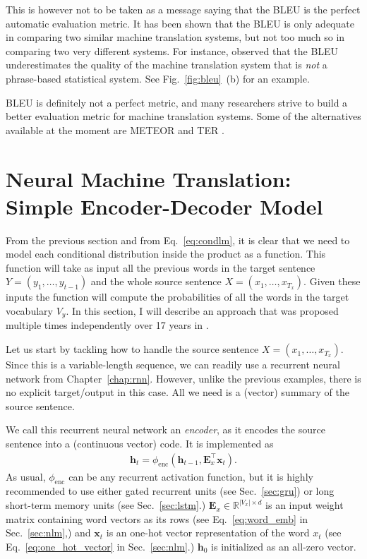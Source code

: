 \documentclass{report}
\newcommand{\vect}[1]{\mathbf{#1}}
\newcommand{\matr}[1]{\mathbf{#1}}
\newcommand{\vh}[0]{\vect{h}}
\newcommand{\vx}[0]{\vect{x}}
\newcommand{\mE}[0]{\matr{E}}
\newcommand{\RR}[0]{\mathbb{R}}
\newcommand{\enc}{\text{enc}}
\begin{document}
This is however not to be taken as a message saying that the BLEU is the perfect
automatic evaluation metric. It has been shown that the BLEU is only adequate in
comparing two similar machine translation systems, but not too much so in
comparing two very different systems. For instance,
\citet{callison2006re} observed that the BLEU underestimates the quality of
the machine translation system that is {\em not} a phrase-based statistical
system. See Fig.~\ref{fig:bleu}~(b) for an example.

BLEU is definitely not a perfect metric, and many researchers strive to build a
better evaluation metric for machine translation systems. Some of the
alternatives available at the moment are
METEOR \citep{denkowski:lavie:meteor-wmt:2014} and TER \citep{snover2006study}.

\section{Neural Machine Translation: \\ Simple Encoder-Decoder Model}
\label{sec:nmt_simple}

From the previous section and  from Eq.~\ref{eq:condlm}, it is clear that we
need to model each conditional distribution inside the product as a function.
This function will take as input all the previous words in the target sentence
$Y=(y_1, \ldots, y_{t-1})$ and the whole source sentence $X=(x_1, \ldots, x_{T_x})$.
Given these inputs the function will compute the probabilities of all the words
in the target vocabulary $V_y$. In this section, I will describe an approach
that was proposed multiple times independently over 17 years in
\citet{forcada1997recursive,cho2014learning,sutskever2014sequence}.

Let us start by tackling how to handle the source sentence $X=(x_1, \ldots,
x_{T_x})$. Since this is a variable-length sequence, we can readily use a
recurrent neural network from Chapter~\ref{chap:rnn}. However, unlike the
previous examples, there is no explicit target/output in this case. All we need
is a (vector) summary of the source sentence.

We call this recurrent neural network an {\em encoder}, as it encodes the source
sentence into a (continuous vector) code. It is implemented as
\begin{align}
    \label{eq:nmt_encoder}
    \vh_t = \phi_{\enc}\left( \vh_{t-1}, \mE_x^\top \vx_t \right).
\end{align}
As usual, $\phi_{\enc}$ can be any recurrent activation function, but it is
highly recommended to use either gated recurrent units (see Sec.~\ref{sec:gru})
or long short-term memory units (see Sec.~\ref{sec:lstm}.) $\mE_x \in \RR^{|V_x|
\times d}$ is an input weight matrix containing word vectors as its rows (see
Eq.~\eqref{eq:word_emb} in Sec.~\ref{sec:nlm},) and $\vx_t$ is an one-hot vector
representation of the word $x_t$ (see Eq.~\eqref{eq:one_hot_vector} in
Sec.~\ref{sec:nlm}.) $\vh_0$ is initialized as an all-zero vector.
\end{document}
